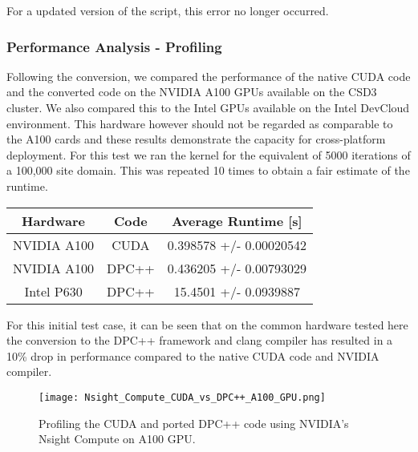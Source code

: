 For a updated version of the script, this error no longer occurred.

\subsubsection{Performance Analysis - Profiling}
Following the conversion, we compared the performance of the native CUDA code and the converted code on the NVIDIA A100 GPUs available on the CSD3 cluster. We also compared this to the Intel GPUs available on the Intel DevCloud environment. This hardware however should not be regarded as comparable to the A100 cards and these results demonstrate the capacity for cross-platform deployment. For this test we ran the kernel for the equivalent of 5000 iterations of a 100,000 site domain. This was repeated 10 times to obtain a fair estimate of the runtime.

\begin{center}
	\begin{tabular}{||c c c||}
		\hline
		Hardware    & Code  & Average Runtime [s]     \\ [0.5ex]
		\hline\hline
		NVIDIA A100 & CUDA  & 0.398578 +/- 0.00020542 \\
		\hline
		NVIDIA A100 & DPC++ & 0.436205 +/- 0.00793029 \\
		\hline
		Intel P630  & DPC++ & 15.4501 +/- 0.0939887   \\ [1ex]
		\hline
	\end{tabular}
\end{center}

For this initial test case, it can be seen that on the common hardware tested here the conversion to the DPC++ framework and clang compiler has resulted in a 10\% drop in performance compared to the native CUDA code and NVIDIA compiler.

\begin{figure}[htp]
	\centering
	\texttt{[image: Nsight\_Compute\_CUDA\_vs\_DPC++\_A100\_GPU.png]}
	\caption{Profiling the CUDA and ported DPC++ code using NVIDIA's Nsight Compute on A100 GPU.}
	\label{fig:ncu_CUDA_Vs_DPC++_A100GPU}
\end{figure}

